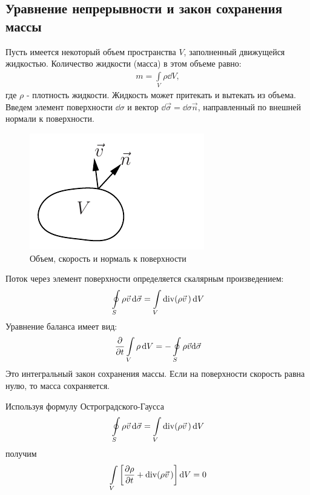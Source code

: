 \subsection{Уравнение непрерывности и закон сохранения массы}
Пусть имеется некоторый объем пространства $V$, заполненный движущейся  жидкостью. Количество жидкости (масса) в этом объеме равно:
\begin{align*} 
m=\int\limits_{V} \rho\dd{V},
\end{align*}
где $\rho$ - плотность жидкости. Жидкость может притекать и вытекать из объема. Введем элемент поверхности $ \dd\sigma $ и вектор $ \dd \vec{\sigma}=\dd\sigma \vec{n} $, направленный по внешней нормали к поверхности. 
\begin{figure}[H]
	\vspace{-10pt}
	\centering
	\includegraphics[scale=1]{photo/4.pdf}
	\caption{Объем, скорость и нормаль к поверхности}
	\label{fig:figure4}
\end{figure}
Поток через элемент поверхности определяется скалярным произведением:
\begin{align*}
\oint\limits_{S} \rho \vec{v}\, \dd\vec{\sigma}=\int\limits_{V} \operatorname{div}(\rho \vec{v}\,)\dd{V}
\end{align*}
Уравнение баланса имеет вид:
\begin{align*} 
\pdv{t} \int\limits_{V} \rho\dd{V}=-\oint\limits_{S} \rho \vec{v} \dd\vec{\sigma}
\end{align*}
Это интегральный закон сохранения массы. Если на поверхности скорость равна нулю, то масса сохраняется.

Используя формулу Остроградского-Гаусса
\begin{align*} 
\oint\limits_{S} \rho \vec{v}\, \dd \vec{\sigma}=\int\limits_{V} \operatorname{div} (\rho \vec{v}\,)\dd{V}
\end{align*}
получим 
\begin{align*} 
\int\limits_{V}\left[\frac{\partial \rho}{\partial t}+\operatorname{div}(\rho \vec{v}\,)\right]\dd{V}=0
\end{align*}

